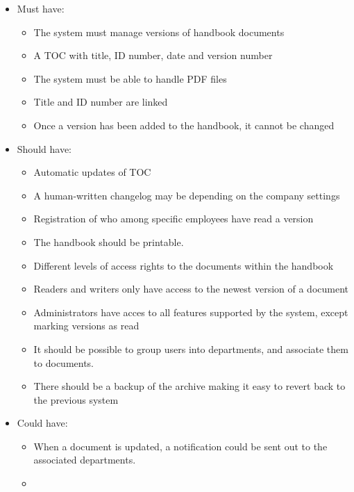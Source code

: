 \begin{itemize}
    \item
    Must have:
        \begin{itemize}
            \item
            The system must manage versions of handbook documents
            \item
            A TOC with title, ID number, date and version number
            \item
            The system must be able to handle PDF files
            \item
            Title and ID number are linked
            \item
            Once a version has been added to the handbook, it cannot be changed
        \end{itemize}
    \item
    Should have:
        \begin{itemize}
			\item
			Automatic updates of TOC
            \item
            A human-written changelog may be depending on the company settings
            \item
            Registration of who among specific employees have read a version
            \item
            The handbook should be printable.
            \item
            Different levels of access rights to the documents within the handbook
            \item
            Readers and writers only have access to the newest version of a document
            \item
            Administrators have acces to all features supported by the system, except marking versions as read
            \item
            It should be possible to group users into departments, and associate them to documents.
            \item
            There should be a backup of the archive making it easy to revert back to the previous system
        \end{itemize}
    \item
    Could have:
        \begin{itemize}
            \item
            When a document is updated, a notification could be sent out to the associated departments.
            \item

\end{itemize}
\end{itemize}
